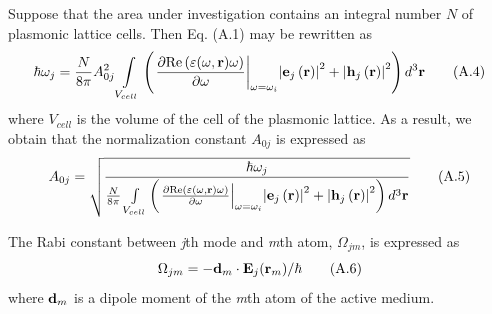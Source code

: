 \documentclass[aps,pra,amsmath,amssymb,onecolumn,superscriptaddress,showpacs,floatfix,]{revtex4-1}
\begin{document}
Suppose that the area under investigation contains an integral number $N$ of plasmonic lattice cells.
Then Eq. (A.1) may be rewritten as
\begin{equation}
\hbar {\omega _j} =\frac{N}{{8\pi }} A_{0j}^2 \int\limits_{{V_{cell}}} {\left( {{{\left. {\frac{{\partial {\mathop{\rm Re}\nolimits} \left( {\varepsilon(\omega, \textbf{r}) \omega } \right)}}{{\partial \omega }}} \right|}_{\omega  = {\omega _i}}}{{\left| {{{\bf{e}}_j}\left( {\bf{r}} \right)} \right|}^2} + {{\left| {{{\bf{h}}_j}\left( {\bf{r}} \right)} \right|}^2}} \right){d^3}{\bf{r}}} \tag{A.4}
\end{equation}
where ${V_{cell}}$  is the volume of the cell of the plasmonic lattice. As a result, we obtain that the normalization constant $A_{0j}$ is expressed as
\begin{equation}
A_{0j} =\sqrt{\frac{\hbar {\omega _j}}{\frac{N}{{8\pi }} \int\limits_{{V_{cell}}} {\left( {{{\left. {\frac{{\partial {\mathop{\rm Re}\nolimits} \left( {\varepsilon(\omega, \textbf{r}) \omega } \right)}}{{\partial \omega }}} \right|}_{\omega  = {\omega _i}}}{{\left| {{{\bf{e}}_j}\left( {\bf{r}} \right)} \right|}^2} + {{\left| {{{\bf{h}}_j}\left( {\bf{r}} \right)} \right|}^2}} \right){d^3}{\bf{r}}}}} \tag{A.5}
\end{equation}

The Rabi constant between \textit{j}th mode and \textit{m}th atom, ${\Omega _{jm}}$, is expressed as
\begin{equation}
{\Omega _{jm}} =  - {{{\bf{d}}_m} \cdot {{\bf{E}}_j}({{\bf{r}}_m})/ \hbar} \tag{A.6}
\end{equation}
where ${\bf{d}}_m$ is a dipole moment of the \textit{m}th atom of the active medium.
\end{document}
